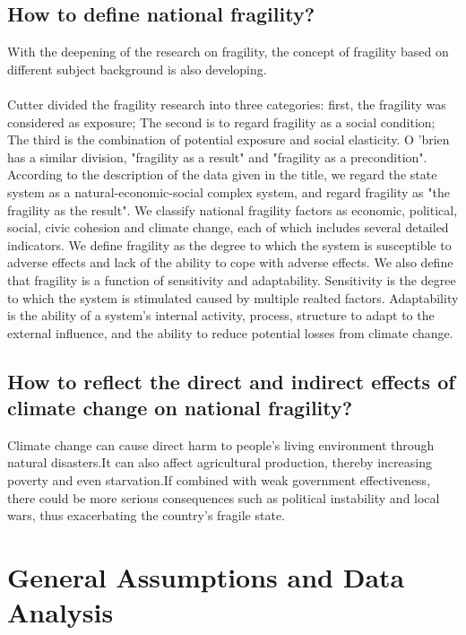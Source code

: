 \documentclass{mcmthesis}
\newcommand{\upcite}[1]{\textsuperscript{\textsuperscript{\cite{#1}}}}
\begin{document}
\subsection{How to define national fragility?}
With the deepening of the research on fragility, the concept of fragility 
based on different subject background is also developing.\\\\
Cutter divided the fragility research into three categories: first, the 
fragility was considered as exposure; The second is to regard fragility 
as a social condition; The third is the combination of potential exposure 
and social elasticity.\upcite{bib18} O 'brien has a similar division, "fragility 
as a result" and "fragility as a precondition".\upcite{bib19} According to the 
description of the data given in the title, we regard the state system as a 
natural-economic-social complex system, and regard fragility as "the fragility 
as the result". We classify national fragility factors as economic, political, 
social, civic cohesion and climate change, each of which includes several detailed 
indicators. We define fragility as the degree to which the system is susceptible 
to adverse effects and lack of the ability to cope with adverse effects. We also 
define that fragility is a function of sensitivity and adaptability. 
Sensitivity is the degree to which the system is stimulated caused by multiple 
realted factors. Adaptability is the ability of a system's internal activity, 
process, structure to adapt to the external influence, and the ability to reduce 
potential losses from climate change.
\subsection{How to reflect the direct and indirect effects of climate change on national fragility?}
Climate change can cause direct harm to people's living environment through natural 
disasters.It can also affect agricultural production, thereby increasing 
poverty and even starvation.If combined with weak government effectiveness, 
there could be more serious consequences such as political instability and 
local wars, thus exacerbating the country's fragile state.
\section{General Assumptions and Data Analysis}
\end{document}
